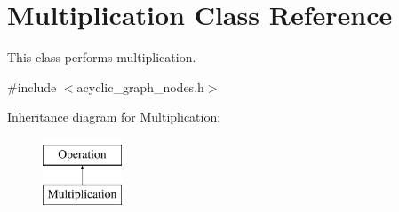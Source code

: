 \hypertarget{classMultiplication}{}\section{Multiplication Class Reference}
\label{classMultiplication}


This class performs multiplication.  




{\ttfamily \#include $<$acyclic\+\_\+graph\+\_\+nodes.\+h$>$}

Inheritance diagram for Multiplication\+:\begin{figure}[H]
\begin{center}
\leavevmode
\includegraphics[height=2.000000cm]{classMultiplication}
\end{center}
\end{figure}
